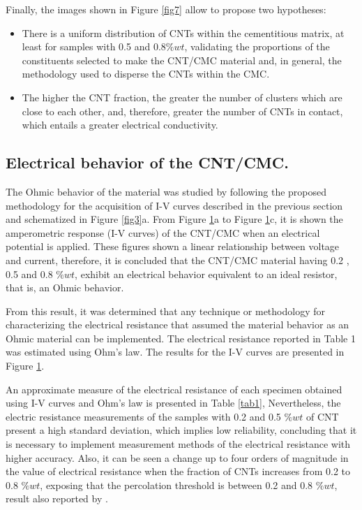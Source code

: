 \documentclass[twocolumn]{bmcart}%
\begin{document}
Finally, the images shown in Figure \ref{fig7} allow to propose two hypotheses:

\begin{itemize}
    

\item  There is a uniform distribution of CNTs within the cementitious matrix, at least for samples with 0.5  and 0.8$\%wt$, validating the proportions of the constituents selected to make the CNT/CMC material and, in general, the methodology used to disperse the CNTs within the CMC.
\item 	The higher the CNT fraction, the greater the number of clusters which are close to each other, and, therefore, greater the number of CNTs in contact, which entails a greater electrical conductivity.

\end{itemize}



\subsection{Electrical behavior of the CNT/CMC.}

The Ohmic behavior of the material was studied by following the proposed methodology for the acquisition of I-V curves described in the previous section and schematized in Figure \ref{fig3}a. From Figure \ref{fig8}a to Figure \ref{fig8}c, it is shown the amperometric response (I-V curves) of the CNT/CMC when an electrical potential is applied. These figures shown a linear relationship between voltage and current, therefore, it is concluded that the CNT/CMC material having 0.2 , 0.5 and 0.8 $\%wt$, exhibit an electrical behavior equivalent to an ideal resistor, that is, an Ohmic behavior.

From this result, it was determined that any technique or methodology for characterizing the electrical resistance that assumed the material behavior as an Ohmic material can be implemented. The electrical resistance reported in Table 1 was estimated using Ohm's law. The results for the I-V curves are presented in Figure \ref{fig8}.

\begin{figure}[h!]
  \caption{
      }
      \label{fig8}
      \end{figure}
  

An approximate measure of the electrical resistance of each specimen obtained using  I-V curves and Ohm's law is presented in Table \ref{tab1}, Nevertheless, the electric resistance measurements of the samples with 0.2  and 0.5 $\%wt$ of CNT present a high standard deviation, which implies low reliability, concluding that it is necessary to implement measurement methods of the electrical resistance with higher accuracy. Also, it can be seen a change up to four orders of magnitude in the value of electrical resistance when the fraction of CNTs increases from 0.2  to 0.8 $\%wt$, exposing that the percolation threshold is between 0.2 and 0.8 $\%wt$, result also reported by \cite{Garcia-Macias2017}.
\end{document}
